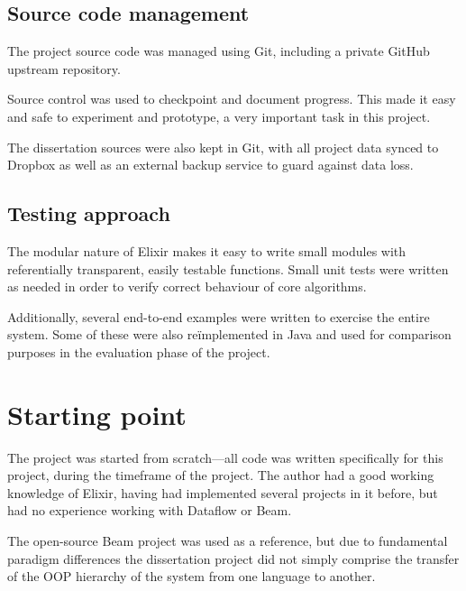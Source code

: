 \subsection{Source code management}\label{sec:prep:softeng:scm}

The project source code was managed using Git, including a private GitHub upstream repository.

Source control was used to checkpoint and document progress.
This made it easy and safe to experiment and prototype, a very important task in this project.

The dissertation sources were also kept in Git, with all project data synced to Dropbox as well as an external backup service to guard against data loss.

\subsection{Testing approach}\label{sec:prep:softeng:testing}

The modular nature of Elixir makes it easy to write small modules with referentially transparent, easily testable functions.
Small unit tests were written as needed in order to verify correct behaviour of core algorithms.

Additionally, several end-to-end examples were written to exercise the entire system.
Some of these were also re\"implemented in Java and used for comparison purposes in the evaluation phase of the project.

\section{Starting point}\label{sec:prep:starting}

The project was started from scratch---all code was written specifically for this project, during the timeframe of the project.
The author had a good working knowledge of Elixir, having had implemented several projects in it before, but had no experience working with Dataflow or Beam.

The open-source Beam project was used as a reference, but due to fundamental paradigm differences the dissertation project did not simply comprise the transfer of the OOP hierarchy of the system from one language to another.